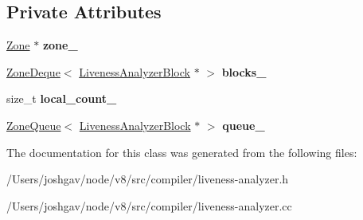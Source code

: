 \subsection*{Private Attributes}
\begin{DoxyCompactItemize}
\item 
\hyperlink{classv8_1_1internal_1_1_zone}{Zone} $\ast$ {\bfseries zone\+\_\+}\hypertarget{classv8_1_1internal_1_1compiler_1_1_liveness_analyzer_a3ffa6c48c0c1b6ca568d4dbcac53d362}{}\label{classv8_1_1internal_1_1compiler_1_1_liveness_analyzer_a3ffa6c48c0c1b6ca568d4dbcac53d362}

\item 
\hyperlink{classv8_1_1internal_1_1_zone_deque}{Zone\+Deque}$<$ \hyperlink{classv8_1_1internal_1_1compiler_1_1_liveness_analyzer_block}{Liveness\+Analyzer\+Block} $\ast$ $>$ {\bfseries blocks\+\_\+}\hypertarget{classv8_1_1internal_1_1compiler_1_1_liveness_analyzer_a5d218f4591079591e526f99f30d5ec8d}{}\label{classv8_1_1internal_1_1compiler_1_1_liveness_analyzer_a5d218f4591079591e526f99f30d5ec8d}

\item 
size\+\_\+t {\bfseries local\+\_\+count\+\_\+}\hypertarget{classv8_1_1internal_1_1compiler_1_1_liveness_analyzer_a8fbda582fce9fdbc6ec74067843668d2}{}\label{classv8_1_1internal_1_1compiler_1_1_liveness_analyzer_a8fbda582fce9fdbc6ec74067843668d2}

\item 
\hyperlink{classv8_1_1internal_1_1_zone_queue}{Zone\+Queue}$<$ \hyperlink{classv8_1_1internal_1_1compiler_1_1_liveness_analyzer_block}{Liveness\+Analyzer\+Block} $\ast$ $>$ {\bfseries queue\+\_\+}\hypertarget{classv8_1_1internal_1_1compiler_1_1_liveness_analyzer_a3473e89f2dd19e2e1737d8062f613122}{}\label{classv8_1_1internal_1_1compiler_1_1_liveness_analyzer_a3473e89f2dd19e2e1737d8062f613122}

\end{DoxyCompactItemize}


The documentation for this class was generated from the following files\+:\begin{DoxyCompactItemize}
\item 
/\+Users/joshgav/node/v8/src/compiler/liveness-\/analyzer.\+h\item 
/\+Users/joshgav/node/v8/src/compiler/liveness-\/analyzer.\+cc\end{DoxyCompactItemize}
